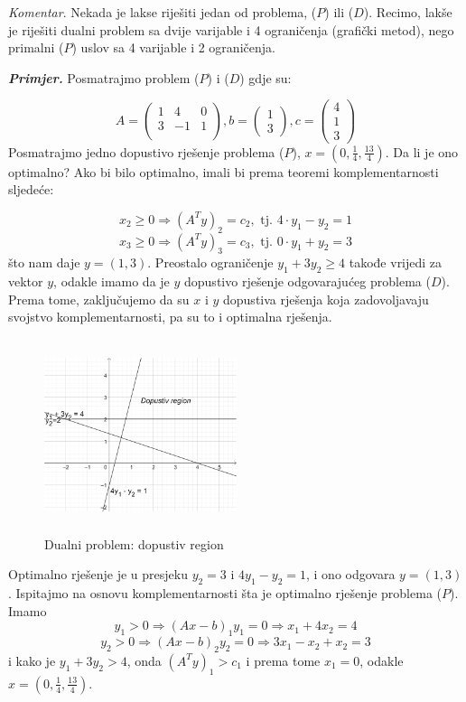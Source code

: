 \documentclass[a4paper, utf8, 11pt, colorlinks]{book}
\begin{document}
\emph{Komentar}.  Nekada je lakse riješiti jedan od problema, ($P$)  ili  ($D$).  Recimo, lakše je riješiti dualni problem sa dvije varijable i 4 ograničenja (grafički metod), nego primalni  ($P$)  uslov sa 4 varijable i 2 ograničenja. 

\emph{\textbf{Primjer.}} Posmatrajmo problem  ($P$)  i  ($D$)  gdje su:
 
$$      A = \left(\begin{array}{ccc}
          1 &  4 & 0 \\
          3 & -1 & 1 \\
      \end{array} \right ), b = \left (\begin{array}{c}
           1 \\
           3
      \end{array}\right ), c =\left ( \begin{array}{c}
           4  \\
           1  \\
           3
      \end{array} \right )
 $$
Posmatrajmo jedno dopustivo rješenje problema  ($P$), $x = (0, \frac{1}{4}, \frac{13}{4})$. Da li je ono optimalno? Ako bi bilo optimalno, imali bi prema teoremi komplementarnosti sljedeće:

$$x_2 \geq 0 \Rightarrow  (A^T y)_2  = c_2, \mbox{ tj. } 4 \cdot y_1 - y_2 = 1$$
$$x_3 \geq 0 \Rightarrow  (A^T y)_3  = c_3, \mbox{ tj. } 0 \cdot y_1 + y_2 = 3$$
što nam daje  $y = (1, 3)$. Preostalo ograničenje $y_1 + 3 y_2 \geq 4$ takođe vrijedi za vektor $y$, odakle imamo da je $y$ dopustivo rješenje odgovarajućeg problema  ($D$).  Prema tome, zaključujemo da su $x$ i $y$ dopustiva rješenja koja zadovoljavaju svojstvo komplementarnosti, pa su to i optimalna rješenja. 

\begin{figure}[!ht]
    \centering
     \includegraphics[width=160pt, height=160pt]{fig5.eps}
    \caption{Dualni problem: dopustiv region}
    \label{fig:fig5}
\end{figure}
Optimalno rješenje je u presjeku $y_2 = 3$ i $4y_1 - y_2 = 1$, i ono odgovara $y = (1, 3)$. Ispitajmo na osnovu komplementarnosti šta je optimalno rješenje problema ($P$). Imamo 
$$y_1 > 0 \Rightarrow (Ax - b)_1 y_1 = 0 \Rightarrow x_1 + 4 x_2 = 4 $$
$$y_2 > 0 \Rightarrow (Ax - b)_2 y_2 = 0 \Rightarrow 3x_1 - x_2 + x_2 = 3 $$
i kako je $y_1 + 3 y_2 > 4$, onda $(A^Ty)_1 > c_1$ i prema tome $x_1 =0$, 
odakle $x =(0, \frac{1}{4}, \frac{13}{4})$. 
\end{document}
